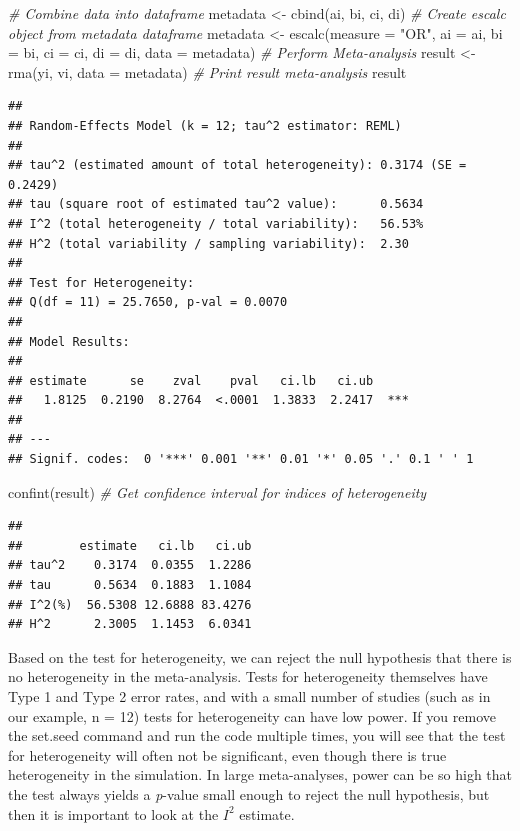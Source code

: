 \documentclass[
  oneside]{krantz}
\makeatletter
\newenvironment{Shaded}{\begin{snugshade}}{\end{snugshade}}
\newcommand{\AttributeTok}[1]{\textcolor[rgb]{0.61,0.61,0.61}{#1}}
\newcommand{\CommentTok}[1]{\textcolor[rgb]{0.37,0.37,0.37}{\textit{#1}}}
\newcommand{\FunctionTok}[1]{\textcolor[rgb]{0,0,0}{#1}}
\newcommand{\NormalTok}[1]{#1}
\newcommand{\OtherTok}[1]{\textcolor[rgb]{0.37,0.37,0.37}{#1}}
\newcommand{\StringTok}[1]{\textcolor[rgb]{0.5,0.5,0.5}{#1}}
\newenvironment{kframe}{%
\medskip{}
\setlength{\fboxsep}{.8em}
 \def\at@end@of@kframe{}%
 \ifinner\ifhmode%
  \def\at@end@of@kframe{\end{minipage}}%
  \begin{minipage}{\columnwidth}%
 \fi\fi%
 \def\FrameCommand##1{\hskip\@totalleftmargin \hskip-\fboxsep
 \colorbox{shadecolor}{##1}\hskip-\fboxsep
     \hskip-\linewidth \hskip-\@totalleftmargin \hskip\columnwidth}%
 \MakeFramed {\advance\hsize-\width
   \@totalleftmargin\z@ \linewidth\hsize
   \@setminipage}}%
 {\par\unskip\endMakeFramed%
 \at@end@of@kframe}
\renewenvironment{Shaded}{\begin{kframe}}{\end{kframe}}
\makeatother
\begin{document}
\begin{Shaded}
\begin{Highlighting}[]
\CommentTok{\# Combine data into dataframe}
\NormalTok{metadata }\OtherTok{\textless{}{-}} \FunctionTok{cbind}\NormalTok{(ai, bi, ci, di)}
\CommentTok{\# Create escalc object from metadata dataframe }
\NormalTok{metadata }\OtherTok{\textless{}{-}} \FunctionTok{escalc}\NormalTok{(}\AttributeTok{measure =} \StringTok{"OR"}\NormalTok{, }
                   \AttributeTok{ai =}\NormalTok{ ai, }\AttributeTok{bi =}\NormalTok{ bi, }\AttributeTok{ci =}\NormalTok{ ci, }\AttributeTok{di =}\NormalTok{ di, }
                   \AttributeTok{data =}\NormalTok{ metadata)}
\CommentTok{\# Perform Meta{-}analysis}
\NormalTok{result }\OtherTok{\textless{}{-}} \FunctionTok{rma}\NormalTok{(yi, vi, }\AttributeTok{data =}\NormalTok{ metadata)}
\CommentTok{\# Print result meta{-}analysis}
\NormalTok{result}
\end{Highlighting}
\end{Shaded}

\begin{verbatim}
## 
## Random-Effects Model (k = 12; tau^2 estimator: REML)
## 
## tau^2 (estimated amount of total heterogeneity): 0.3174 (SE = 0.2429)
## tau (square root of estimated tau^2 value):      0.5634
## I^2 (total heterogeneity / total variability):   56.53%
## H^2 (total variability / sampling variability):  2.30
## 
## Test for Heterogeneity:
## Q(df = 11) = 25.7650, p-val = 0.0070
## 
## Model Results:
## 
## estimate      se    zval    pval   ci.lb   ci.ub     ​ 
##   1.8125  0.2190  8.2764  <.0001  1.3833  2.2417  *** 
## 
## ---
## Signif. codes:  0 '***' 0.001 '**' 0.01 '*' 0.05 '.' 0.1 ' ' 1
\end{verbatim}

\begin{Shaded}
\begin{Highlighting}[]
\FunctionTok{confint}\NormalTok{(result) }\CommentTok{\# Get confidence interval for indices of heterogeneity}
\end{Highlighting}
\end{Shaded}

\begin{verbatim}
## 
##        estimate   ci.lb   ci.ub 
## tau^2    0.3174  0.0355  1.2286 
## tau      0.5634  0.1883  1.1084 
## I^2(%)  56.5308 12.6888 83.4276 
## H^2      2.3005  1.1453  6.0341
\end{verbatim}

Based on the test for heterogeneity, we can reject the null hypothesis that there is no heterogeneity in the meta-analysis. Tests for heterogeneity themselves have Type 1 and Type 2 error rates, and with a small number of studies (such as in our example, n = 12) tests for heterogeneity can have low power. If you remove the set.seed command and run the code multiple times, you will see that the test for heterogeneity will often not be significant, even though there is true heterogeneity in the simulation. In large meta-analyses, power can be so high that the test always yields a \emph{p}-value small enough to reject the null hypothesis, but then it is important to look at the \(I^2\) estimate.
\end{document}
